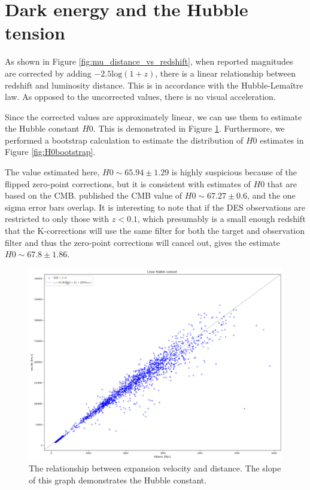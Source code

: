 \documentclass{article}
\begin{document}
\section{Dark energy and the Hubble tension}
\label{sec:tension}

As shown in Figure \ref{fig:mu_distance_vs_redshift}, when reported magnitudes
are corrected by adding $-2.5\text{log}(1+z)$, there is a linear relationship
between redshift and luminosity distance. This is in accordance with the
Hubble-Lema\^{i}tre law. As opposed to the uncorrected values, there is no
visual acceleration.

Since the corrected values are approximately linear, we can use them to
estimate the Hubble constant $H0$. This is demonstrated in Figure
\ref{fig:expansion}. Furthermore, we performed a bootstrap calculation to
estimate the distribution of $H0$ estimates in Figure \ref{fig:H0bootstrap}.

The value estimated here, $H0 \sim 65.94 \pm 1.29$ is highly suspicious because of the
flipped zero-point corrections, but it is consistent with estimates of $H0$
that are based on the CMB. \citet{planck2020} published the CMB value of $H0
\sim 67.27 \pm 0.6$, and the one sigma error bars overlap. It is interesting to
note that if the DES observations are restricted to only those with $z < 0.1$,
which presumably is a small enough redshift that the K-corrections will use the
same filter for both the target and observation filter and thus the zero-point
corrections will cancel out, gives the estimate $H0 \sim 67.8 \pm 1.86$.

\begin{figure}[ht]
  \includegraphics[width=\linewidth]{velocity_vs_distance.png}
  \caption{The relationship between expansion velocity and distance. The slope of this graph demonstrates the Hubble constant.
  }
\label{fig:expansion}
\end{figure}
\end{document}
